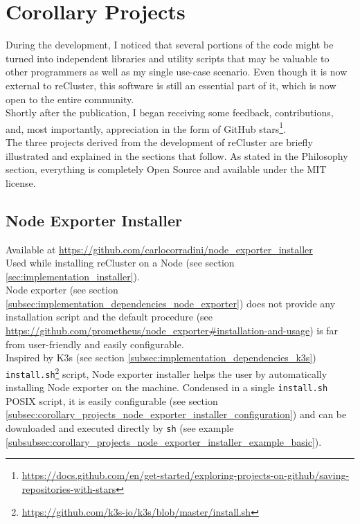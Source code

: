 \chapter{Corollary Projects}
\label{cha:corollary_projects}

During the development, I noticed that several portions of the code might be
turned into independent libraries and utility scripts that may be valuable to
other programmers as well as my single use-case scenario. Even though it is now external
to reCluster, this software is still an essential part of it, which is now open to
the entire community. \\ %
Shortly after the publication, I began receiving some feedback, contributions,
and, most importantly, appreciation in the form of GitHub stars\footnote{\url{https://docs.github.com/en/get-started/exploring-projects-on-github/saving-repositories-with-stars}}.
\\ %
The three projects derived from the development of reCluster are briefly
illustrated and explained in the sections that follow. As stated in the Philosophy
section, everything is completely Open Source and available under the MIT
license.

\section{Node Exporter Installer}
\label{sec:corollary_projects_node_exporter_installer}

Available at \url{https://github.com/carlocorradini/node\_exporter\_installer} \\ %
Used while installing reCluster on a Node (see section \ref{sec:implementation_installer}).
\\ %
Node exporter (see section \ref{subsec:implementation_dependencies_node_exporter})
does not provide any installation script and the default procedure (see \url{https://github.com/prometheus/node_exporter#installation-and-usage})
is far from user-friendly and easily configurable. \\ %
Inspired by K3s (see section \ref{subsec:implementation_dependencies_k3s})
\texttt{install.sh}\footnote{\url{https://github.com/k3s-io/k3s/blob/master/install.sh}}
script, Node exporter installer helps the user by automatically installing Node
exporter on the machine. Condensed in a single \texttt{install.sh} POSIX script,
it is easily configurable (see section
\ref{subsec:corollary_projects_node_exporter_installer_configuration}) and can be
downloaded and executed directly by \texttt{sh} (see example \ref{subsubsec:corollary_projects_node_exporter_installer_example_basic}).

